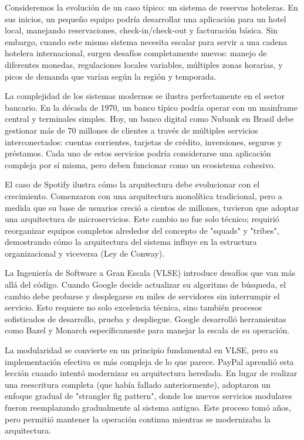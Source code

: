 Consideremos la evolución de un caso típico: un sistema de reservas hoteleras. En sus inicios, un pequeño equipo podría desarrollar una aplicación para un hotel local, manejando reservaciones, check-in/check-out y facturación básica. Sin embargo, cuando este mismo sistema necesita escalar para servir a una cadena hotelera internacional, surgen desafíos completamente nuevos: manejo de diferentes monedas, regulaciones locales variables, múltiples zonas horarias, y picos de demanda que varían según la región y temporada.

La complejidad de los sistemas modernos se ilustra perfectamente en el sector bancario. En la década de 1970, un banco típico podría operar con un mainframe central y terminales simples. Hoy, un banco digital como Nubank en Brasil debe gestionar más de 70 millones de clientes a través de múltiples servicios interconectados: cuentas corrientes, tarjetas de crédito, inversiones, seguros y préstamos. Cada uno de estos servicios podría considerarse una aplicación compleja por sí misma, pero deben funcionar como un ecosistema cohesivo.

El caso de Spotify ilustra cómo la arquitectura debe evolucionar con el crecimiento. Comenzaron con una arquitectura monolítica tradicional, pero a medida que su base de usuarios creció a cientos de millones, tuvieron que adoptar una arquitectura de microservicios. Este cambio no fue solo técnico; requirió reorganizar equipos completos alrededor del concepto de "squads" y "tribes", demostrando cómo la arquitectura del sistema influye en la estructura organizacional y viceversa (Ley de Conway).

La Ingeniería de Software a Gran Escala (VLSE) introduce desafíos que van más allá del código. Cuando Google decide actualizar su algoritmo de búsqueda, el cambio debe probarse y desplegarse en miles de servidores sin interrumpir el servicio. Esto requiere no solo excelencia técnica, sino también procesos sofisticados de desarrollo, prueba y despliegue. Google desarrolló herramientas como Bazel y Monarch específicamente para manejar la escala de su operación.

La modularidad se convierte en un principio fundamental en VLSE, pero su implementación efectiva es más compleja de lo que parece. PayPal aprendió esta lección cuando intentó modernizar su arquitectura heredada. En lugar de realizar una reescritura completa (que había fallado anteriormente), adoptaron un enfoque gradual de "strangler fig pattern", donde los nuevos servicios modulares fueron reemplazando gradualmente al sistema antiguo. Este proceso tomó años, pero permitió mantener la operación continua mientras se modernizaba la arquitectura.

